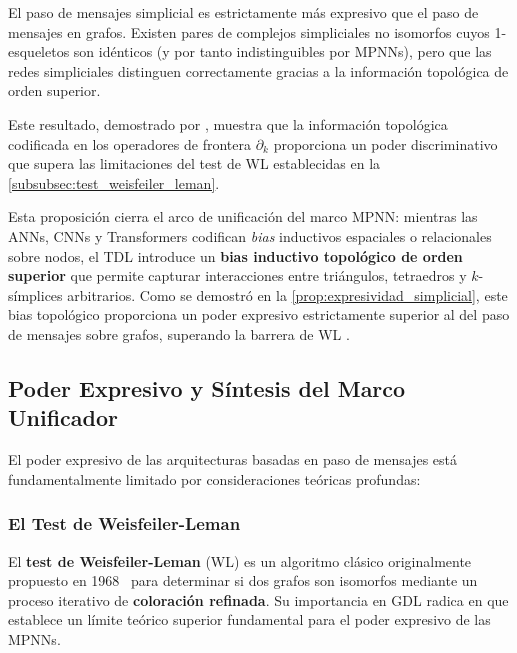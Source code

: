 \begin{proposition}\label{prop:expresividad_simplicial}
	El paso de mensajes simplicial es estrictamente más expresivo que el paso de mensajes en grafos. Existen pares de complejos simpliciales no isomorfos cuyos 1-esqueletos son idénticos (y por tanto indistinguibles por \glspl{MPNN}), pero que las redes simpliciales distinguen correctamente gracias a la información topológica de orden superior.
\end{proposition}

Este resultado, demostrado por \citet{bodnar2021weisfeiler}, muestra que la información topológica codificada en los operadores de frontera $\partial_k$ proporciona un poder discriminativo que supera las limitaciones del test de \gls{WL} establecidas en la \autoref{subsubsec:test_weisfeiler_leman}.

Esta proposición cierra el arco de unificación del marco \gls{MPNN}: mientras las \glspl{ANN}, \glspl{CNN} y \glspl{Transformer} codifican \textit{bias} inductivos espaciales o relacionales sobre nodos, el \gls{TDL} introduce un \textbf{bias inductivo topológico de orden superior} que permite capturar interacciones entre triángulos, tetraedros y $k$-símplices arbitrarios. Como se demostró en la \autoref{prop:expresividad_simplicial}, este bias topológico proporciona un poder expresivo estrictamente superior al del paso de mensajes sobre grafos, superando la barrera de \gls{WL} \citep{bodnar2021weisfeiler, hajij2023topological}.

\subsection{Poder Expresivo y Síntesis del Marco Unificador}\label{subsec:poder_expresivo_sintesis}

El poder expresivo de las arquitecturas basadas en paso de mensajes está fundamentalmente limitado por consideraciones teóricas profundas:

\subsubsection{El Test de Weisfeiler-Leman}\label{subsubsec:test_weisfeiler_leman}

El \textbf{test de Weisfeiler-Leman} (\gls{WL}) es un algoritmo clásico originalmente propuesto en 1968~\citep{weisfeiler1968reduction} para determinar si dos grafos son isomorfos mediante un proceso iterativo de \textbf{coloración refinada}. Su importancia en \gls{GDL} radica en que establece un límite teórico superior fundamental para el poder expresivo de las \glspl{MPNN}.

